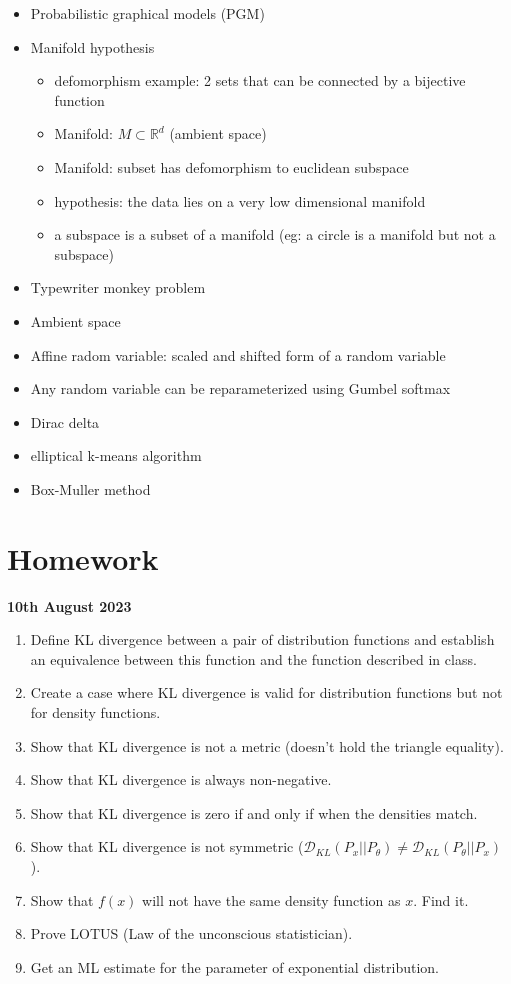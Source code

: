 \documentclass[11pt]{article}
\begin{document}
\begin{itemize}
\item Probabilistic graphical models (PGM)
\item Manifold hypothesis
  \begin{itemize}
  \item defomorphism example: 2 sets that can be connected by a bijective function
  \item Manifold: $M \subset \mathbb{R}^d$ (ambient space)
  \item Manifold: subset has defomorphism to euclidean subspace
  \item hypothesis: the data lies on a very low dimensional manifold
  \item a subspace is a subset of a manifold (eg: a circle is a manifold but not a subspace)
  \end{itemize}
\item Typewriter monkey problem
\item Ambient space
\item Affine radom variable: scaled and shifted form of a random variable
\item Any random variable can be reparameterized using Gumbel softmax
\item Dirac delta
\item elliptical k-means algorithm
\item Box-Muller method
\end{itemize}

\clearpage
\section{Homework}
\label{sec:homework}

\textbf{10th August 2023}
\begin{enumerate}
\item Define KL divergence between a pair of distribution functions and establish an equivalence between this function and the function described in class.
\item Create a case where KL divergence is valid for distribution functions but not for density functions.
\item Show that KL divergence is not a metric (doesn't hold the triangle equality).
\item Show that KL divergence is always non-negative.
\item Show that KL divergence is zero if and only if when the densities match.
\item Show that KL divergence is not symmetric ($\mathcal{D}_{KL}(P_x || P_{\theta}) \not = \mathcal{D}_{KL}(P_{\theta} || P_x)$).
\item Show that $f(x)$ will not have the same density function as $x$. Find it.
\item Prove LOTUS (Law of the unconscious statistician).
\item Get an ML estimate for the parameter of exponential distribution.
\end{enumerate}
\end{document}
